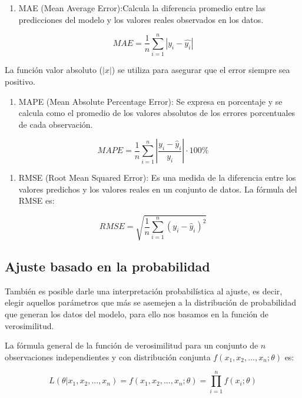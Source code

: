 \documentclass[
]{book}
\providecommand{\tightlist}{%
  \setlength{\itemsep}{0pt}\setlength{\parskip}{0pt}}
\begin{document}
\begin{enumerate}
\def\labelenumi{\arabic{enumi}.}
\setcounter{enumi}{1}
\tightlist
\item
  MAE (Mean Average Error):Calcula la diferencia promedio entre las
  predicciones del modelo y los valores reales observados en los
  datos.
\end{enumerate}

\[MAE = \frac{1}{n}\sum_{i=1}^{n}|y_i - \hat{y_i}|\]

La función valor absoluto (\(|x|\)) se utiliza para asegurar que el error
siempre sea positivo.

\begin{enumerate}
\def\labelenumi{\arabic{enumi}.}
\setcounter{enumi}{2}
\tightlist
\item
  MAPE (Mean Absolute Percentage Error): Se expresa en porcentaje y se
  calcula como el promedio de los valores absolutos de los errores
  porcentuales de cada observación.
\end{enumerate}

\[MAPE = \frac{1}{n} \sum_{i=1}^{n} \left|\frac{y_i - \hat{y}_i}{y_i}\right|\cdot 100\%\]

\begin{enumerate}
\def\labelenumi{\arabic{enumi}.}
\setcounter{enumi}{3}
\tightlist
\item
  RMSE (Root Mean Squared Error): Es una medida de la diferencia entre
  los valores predichos y los valores reales en un conjunto de datos.
  La fórmula del RMSE es:
\end{enumerate}

\[ RMSE = \sqrt{\frac{1}{n}\sum_{i=1}^n(y_i - \hat{y}_i)^2} \]

\hypertarget{ajuste-basado-en-la-probabilidad}{%
\subsection{Ajuste basado en la probabilidad}\label{ajuste-basado-en-la-probabilidad}}

También es posible darle una interpretación probabilística al ajuste, es
decir, elegir aquellos parámetros que más se asemejen a la distribución
de probabilidad que generan los datos del modelo, para ello nos basamos
en la función de verosimilitud.

La fórmula general de la función de verosimilitud para un conjunto de
\(n\) observaciones independientes y con distribución conjunta
\(f(x_1, x_2, ..., x_n; θ)\) es:

\[L(\theta | x_1, x_2, ..., x_n) = f(x_1, x_2, ..., x_n; \theta) = \prod_{i=1}^{n} f(x_i;\theta)\]
\end{document}
